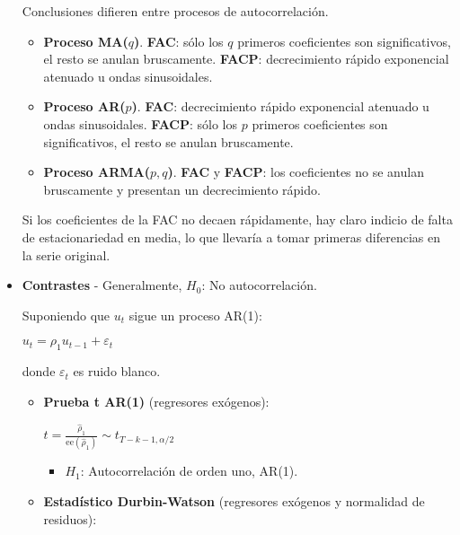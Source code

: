 \documentclass[10pt, a4paper, landscape]{article}
\newcommand{\se}{\mathrm{ee}}
\begin{document}
\begin{multicols}{3}
\begin{itemize}[leftmargin=*]
			Conclusiones difieren entre procesos de autocorrelación.
			
			\columnbreak
			
			\begin{itemize}[leftmargin=*]
				\item \textbf{Proceso MA($q$)}. \textbf{FAC}: sólo los $q$ primeros coeficientes son significativos, el resto se anulan bruscamente. \textbf{FACP}: decrecimiento rápido exponencial atenuado u ondas sinusoidales.
				\item \textbf{Proceso AR($p$)}. \textbf{FAC}: decrecimiento rápido exponencial atenuado u ondas sinusoidales. \textbf{FACP}: sólo los $p$ primeros coeficientes son significativos, el resto se anulan bruscamente.
				\item \textbf{Proceso ARMA($p, q$)}. \textbf{FAC} y \textbf{FACP}: los coeficientes no se anulan bruscamente y presentan un decrecimiento rápido.
			\end{itemize}
			
			Si los coeficientes de la FAC no decaen rápidamente, hay claro indicio de falta de estacionariedad en media, lo que llevaría a tomar primeras diferencias en la serie original.
			
			\item \textbf{Contrastes} - Generalmente, $H_{0}$: No autocorrelación.
			
			Suponiendo que $u_{t}$ sigue un proceso AR(1):
			
			\begin{center}
				$u_{t} = \rho_{1} u_{t - 1} + \varepsilon_{t}$
			\end{center}
			
			donde $\varepsilon_{t}$ es ruido blanco.
			
			\begin{itemize}[leftmargin=*]
				\item \textbf{Prueba t AR(1)} (regresores exógenos):
				
				\begin{center}
					$t = \frac{\hat{\rho}_{1}}{\se(\hat{\rho}_{1})} \sim t_{T - k - 1, \alpha/2}$
				\end{center}
				
				\begin{itemize}[leftmargin=*]
					\item $H_{1}$: Autocorrelación de orden uno, AR(1).
				\end{itemize}
				
				\item \textbf{Estadístico Durbin-Watson} (regresores exógenos y normalidad de residuos):
				

\end{itemize}
\end{itemize}
\end{multicols}
\end{document}
